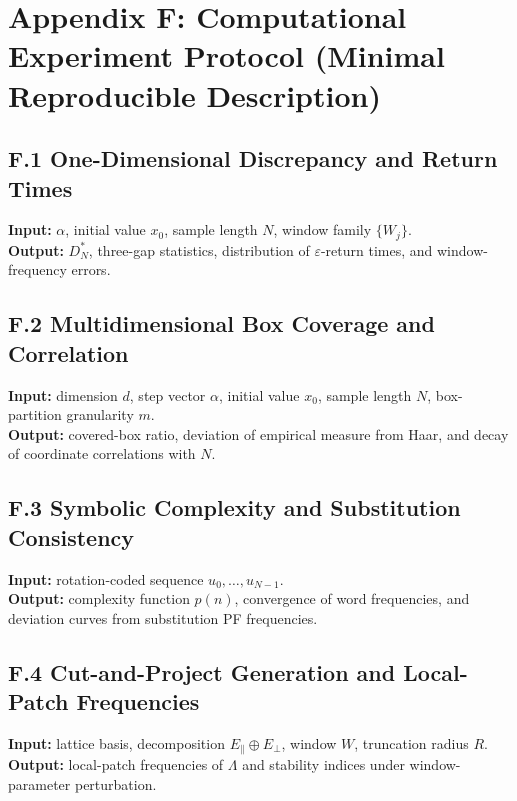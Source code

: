 ﻿\section{Appendix F: Computational Experiment Protocol (Minimal Reproducible Description)}
\label{app:experiments}

\subsection{F.1 One-Dimensional Discrepancy and Return Times}

\textbf{Input:} $\alpha$, initial value $x_0$, sample length $N$, window family $\{W_j\}$.\\
\textbf{Output:} $D_N^*$, three-gap statistics, distribution of $\varepsilon$-return times, and window-frequency errors.

\subsection{F.2 Multidimensional Box Coverage and Correlation}

\textbf{Input:} dimension $d$, step vector $\alpha$, initial value $x_0$, sample length $N$, box-partition granularity $m$.\\
\textbf{Output:} covered-box ratio, deviation of empirical measure from Haar, and decay of coordinate correlations with $N$.

\subsection{F.3 Symbolic Complexity and Substitution Consistency}

\textbf{Input:} rotation-coded sequence $u_0,\dots,u_{N-1}$.\\
\textbf{Output:} complexity function $p(n)$, convergence of word frequencies, and deviation curves from substitution PF frequencies.

\subsection{F.4 Cut-and-Project Generation and Local-Patch Frequencies}

\textbf{Input:} lattice basis, decomposition $E_\parallel\oplus E_\perp$, window $W$, truncation radius $R$.\\
\textbf{Output:} local-patch frequencies of $\Lambda$ and stability indices under window-parameter perturbation.
